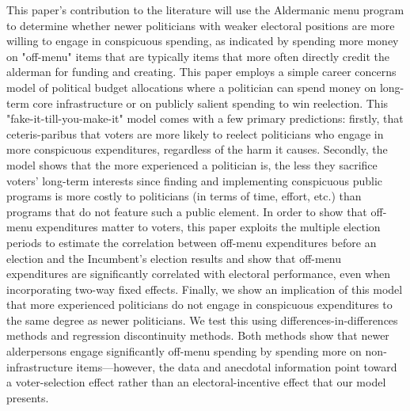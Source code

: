 This paper's contribution to the literature will use the Aldermanic menu program to determine whether newer politicians with weaker electoral positions are more willing to engage in conspicuous spending, as indicated by spending more money on "off-menu" items that are typically items that more often directly credit the alderman for funding and creating. 
This paper employs a simple career concerns model of political budget allocations where a politician can spend money on long-term core infrastructure or on publicly salient spending to win reelection. 
This "fake-it-till-you-make-it" model comes with a few primary predictions: firstly, that ceteris-paribus that voters are more likely to reelect politicians who engage in more conspicuous expenditures, regardless of the harm it causes. 
Secondly, the model shows that the more experienced a politician is, the less they sacrifice voters' long-term interests since finding and implementing conspicuous public programs is more costly to politicians (in terms of time, effort, etc.) than programs that do not feature such a public element. 
In order to show that off-menu expenditures matter to voters, this paper exploits the multiple election periods to estimate the correlation between off-menu expenditures before an election and the Incumbent's election results and show that off-menu expenditures are significantly correlated with electoral performance, even when incorporating two-way fixed effects. 
Finally, we show an implication of this model that more experienced politicians do not engage in conspicuous expenditures to the same degree as newer politicians. 
We test this using differences-in-differences methods and regression discontinuity methods. 
Both methods show that newer alderpersons engage significantly off-menu spending by spending more on non-infrastructure items—however, the data and anecdotal information point toward a voter-selection effect rather than an electoral-incentive effect that our model presents. 



